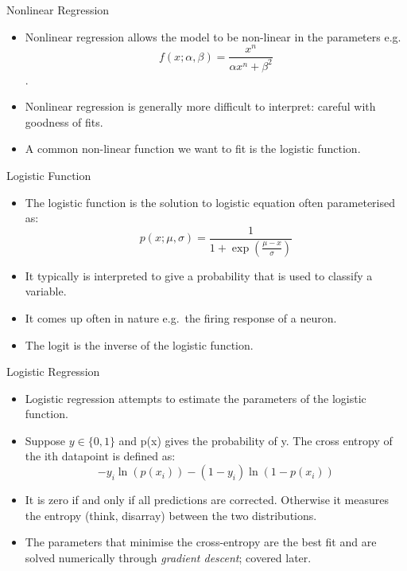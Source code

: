 \documentclass[
  ignorenonframetext,
]{beamer}
\begin{document}
\begin{frame}{Nonlinear Regression}
\protect\hypertarget{nonlinear-regression}{}
\begin{itemize}
\item
  Nonlinear regression allows the model to be non-linear in the
  parameters
  e.g.~\[ f(x; \alpha, \beta) = \frac{x^n}{\alpha x^n + \beta^2} \].
\item
  Nonlinear regression is generally more difficult to interpret: careful
  with goodness of fits.
\item
  A common non-linear function we want to fit is the logistic function.
\end{itemize}
\end{frame}

\begin{frame}{Logistic Function}
\protect\hypertarget{logistic-function}{}
\begin{itemize}
\item
  The logistic function is the solution to logistic equation often
  parameterised as:
  \[ p(x; \mu, \sigma) = \frac{1}{1 + \exp\left(\frac{\mu-x}{\sigma}\right)} \]
\item
  It typically is interpreted to give a probability that is used to
  classify a variable.
\item
  It comes up often in nature e.g.~the firing response of a neuron.
\item
  The logit is the inverse of the logistic function.
\end{itemize}
\end{frame}

\begin{frame}{Logistic Regression}
\protect\hypertarget{logistic-regression}{}
\begin{itemize}
\item
  Logistic regression attempts to estimate the parameters of the
  logistic function.
\item
  Suppose \(y \in \{0,1\}\) and p(x) gives the probability of y. The
  cross entropy of the ith datapoint is defined as:
  \[-y_i \ln(p(x_i)) - (1-y_i) \ln(1-p(x_i))\]
\item
  It is zero if and only if all predictions are corrected. Otherwise it
  measures the entropy (think, disarray) between the two distributions.
\item
  The parameters that minimise the cross-entropy are the best fit and
  are solved numerically through \emph{gradient descent}; covered later.
\end{itemize}
\end{frame}
\end{document}
